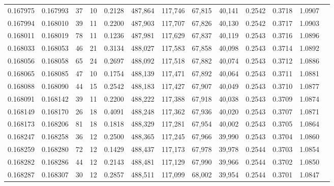 \begin{tabular}{rrrrrrrrrrrrr}
0.167975 & 0.167993 &    37 &  10 &                                     0.2128 & 487,864 & 117,746 &  67,815 &  40,141 & 0.2542 & 0.3718 & 1.0907 \\
0.167994 & 0.168010 &    39 &  11 &                                     0.2200 & 487,903 & 117,707 &  67,826 &  40,130 & 0.2542 & 0.3717 & 1.0903 \\
0.168011 & 0.168019 &    78 &  11 &                                     0.1236 & 487,981 & 117,629 &  67,837 &  40,119 & 0.2543 & 0.3716 & 1.0896 \\
0.168033 & 0.168053 &    46 &  21 &                                     0.3134 & 488,027 & 117,583 &  67,858 &  40,098 & 0.2543 & 0.3714 & 1.0892 \\
0.168056 & 0.168058 &    65 &  24 &                                     0.2697 & 488,092 & 117,518 &  67,882 &  40,074 & 0.2543 & 0.3712 & 1.0886 \\
0.168065 & 0.168085 &    47 &  10 &                                     0.1754 & 488,139 & 117,471 &  67,892 &  40,064 & 0.2543 & 0.3711 & 1.0881 \\
0.168088 & 0.168090 &    44 &  15 &                                     0.2542 & 488,183 & 117,427 &  67,907 &  40,049 & 0.2543 & 0.3710 & 1.0877 \\
0.168091 & 0.168142 &    39 &  11 &                                     0.2200 & 488,222 & 117,388 &  67,918 &  40,038 & 0.2543 & 0.3709 & 1.0874 \\
0.168149 & 0.168170 &    26 &  18 &                                     0.4091 & 488,248 & 117,362 &  67,936 &  40,020 & 0.2543 & 0.3707 & 1.0871 \\
0.168173 & 0.168206 &    81 &  18 &                                     0.1818 & 488,329 & 117,281 &  67,954 &  40,002 & 0.2543 & 0.3705 & 1.0864 \\
0.168247 & 0.168258 &    36 &  12 &                                     0.2500 & 488,365 & 117,245 &  67,966 &  39,990 & 0.2543 & 0.3704 & 1.0860 \\
0.168259 & 0.168280 &    72 &  12 &                                     0.1429 & 488,437 & 117,173 &  67,978 &  39,978 & 0.2544 & 0.3703 & 1.0854 \\
0.168282 & 0.168286 &    44 &  12 &                                     0.2143 & 488,481 & 117,129 &  67,990 &  39,966 & 0.2544 & 0.3702 & 1.0850 \\
0.168287 & 0.168307 &    30 &  12 &                                     0.2857 & 488,511 & 117,099 &  68,002 &  39,954 & 0.2544 & 0.3701 & 1.0847 \\

\end{tabular}
